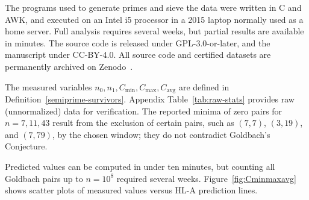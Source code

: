 \documentclass[11pt]{article}
\theoremstyle{inline}
\theoremstyle{break}
\theoremstyle{break}
\theoremstyle{break}
\theoremstyle{break}
\theoremstyle{break}
\theoremstyle{break}
\theoremstyle{break}
\theoremstyle{inline}
\newcommand{\tavg}{{\scriptscriptstyle\mathrm{avg}}}
\newcommand{\Cmeas}{C}              %
\newcommand{\Nmeas}{n}              %
\begin{document}
The programs used to generate primes and sieve the data were written in C and AWK, and executed on an Intel i5 processor in a 2015 laptop normally used as a home server.  Full analysis requires several weeks, but partial results are available in minutes.  The source code is released under GPL-3.0-or-later, and the manuscript under CC-BY-4.0.  All source code and certified datasets are permanently archived on Zenodo~\cite{Riemers2025SieveGoldbach}.

The measured variables \( \Nmeas_0, \Nmeas_1, \Cmeas_{\min}, \Cmeas_{\max}, \Cmeas_{\tavg} \) are defined in Definition~\ref{semiprime-survivors}. Appendix Table~\ref{tab:raw-stats} provides raw (unnormalized) data for verification. The reported minima of zero pairs for \( n=7,11,43 \) result from the exclusion of certain pairs, such as \( (7,7) \), \( (3,19) \), and \( (7,79) \), by the chosen window; they do not contradict Goldbach's Conjecture.

Predicted values can be computed in under ten minutes, but counting all Goldbach pairs up to \( n=10^8 \) required several weeks. Figure~\ref{fig:Cminmaxavg} shows scatter plots of measured values versus HL-A prediction lines.

\pairdata
\end{document}
